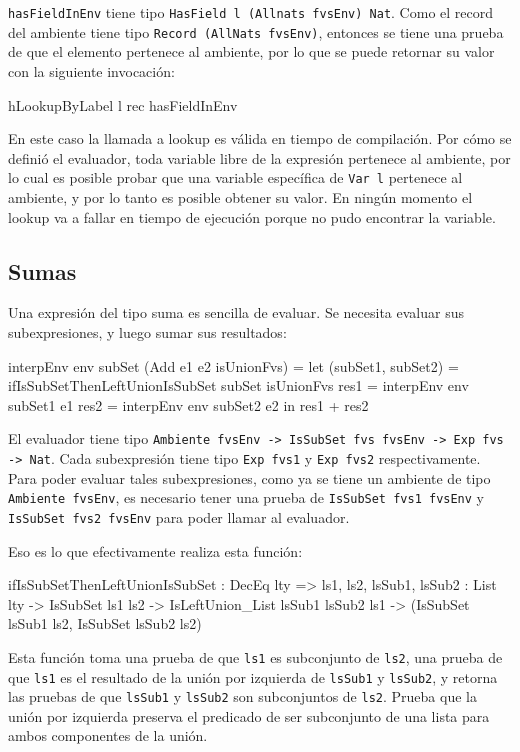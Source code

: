 \texttt{hasFieldInEnv} tiene tipo \texttt{HasField l (Allnats fvsEnv) Nat}. Como el record del ambiente tiene tipo \texttt{Record (AllNats fvsEnv)}, entonces se tiene una prueba de que el elemento pertenece al ambiente, por lo que se puede retornar su valor con la siguiente invocación:

\begin{code}
hLookupByLabel l rec hasFieldInEnv
\end{code}

En este caso la llamada a lookup es válida en tiempo de compilación. Por cómo se definió el evaluador, toda variable libre de la expresión pertenece al ambiente, por lo cual es posible probar que una variable específica de \texttt{Var l} pertenece al ambiente, y por lo tanto es posible obtener su valor. En ningún momento el lookup va a fallar en tiempo de ejecución porque no pudo encontrar la variable.

\subsection{Sumas}

Una expresión del tipo suma es sencilla de evaluar. Se necesita evaluar sus subexpresiones, y luego sumar sus resultados:

\begin{code}
interpEnv env subSet (Add e1 e2 isUnionFvs) =
  let (subSet1, subSet2) =
      ifIsSubSetThenLeftUnionIsSubSet subSet isUnionFvs
    res1 = interpEnv env subSet1 e1
    res2 = interpEnv env subSet2 e2
  in res1 + res2
\end{code}

El evaluador tiene tipo \texttt{Ambiente fvsEnv -> IsSubSet fvs fvsEnv -> Exp fvs -> Nat}. Cada subexpresión tiene tipo \texttt{Exp fvs1} y \texttt{Exp fvs2} respectivamente. Para poder evaluar tales subexpresiones, como ya se tiene un ambiente de tipo \texttt{Ambiente fvsEnv}, es necesario tener una prueba de \texttt{IsSubSet fvs1 fvsEnv} y \texttt{IsSubSet fvs2 fvsEnv} para poder llamar al evaluador.

Eso es lo que efectivamente realiza esta función:

\begin{code}
ifIsSubSetThenLeftUnionIsSubSet : DecEq lty =>
  {ls1, ls2, lsSub1, lsSub2 : List lty} -> IsSubSet ls1 ls2 ->
  IsLeftUnion_List lsSub1 lsSub2 ls1 ->
  (IsSubSet lsSub1 ls2, IsSubSet lsSub2 ls2)
\end{code}

Esta función toma una prueba de que \texttt{ls1} es subconjunto de \texttt{ls2}, una prueba de que \texttt{ls1} es el resultado de la unión por izquierda de \texttt{lsSub1} y \texttt{lsSub2}, y retorna las pruebas de que \texttt{lsSub1} y \texttt{lsSub2} son subconjuntos de \texttt{ls2}. Prueba que la unión por izquierda preserva el predicado de ser subconjunto de una lista para ambos componentes de la unión.


